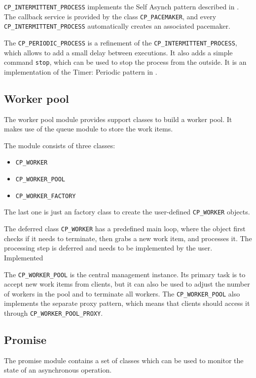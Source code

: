 \documentclass[a4paper,10pt]{report}
\begin{document}
\lstinline!CP_INTERMITTENT_PROCESS! implements the Self Asynch pattern described in .
The callback service is provided by the class \lstinline!CP_PACEMAKER!, and every \lstinline!CP_INTERMITTENT_PROCESS! automatically creates an associated pacemaker.

The \lstinline!CP_PERIODIC_PROCESS! is a refinement of the \lstinline!CP_INTERMITTENT_PROCESS!, which allows to add a small delay between executions.
It also adds a simple command \lstinline!stop!, which can be used to stop the process from the outside.
It is an implementation of the Timer: Periodic pattern in .

\subsection{Worker pool}

The worker pool module provides support classes to build a worker pool.
It makes use of the queue module to store the work items.

The module consists of three classes:

\begin{itemize}
 \item \lstinline!CP_WORKER!
 \item \lstinline!CP_WORKER_POOL!
 \item \lstinline!CP_WORKER_FACTORY!
\end{itemize}

The last one is just an factory class to create the user-defined \lstinline!CP_WORKER! objects.

The deferred class \lstinline!CP_WORKER! has a predefined main loop, where the object first checks if it needs to terminate, then grabs a new work item, and processes it.
The processing step is deferred and needs to be implemented by the user.
Implemented

The \lstinline!CP_WORKER_POOL! is the central management instance.
Its primary task is to accept new work items from clients, but it can also be used to adjust the number of workers in the pool and to terminate all workers.
The \lstinline!CP_WORKER_POOL! also implements the separate proxy pattern, which means that clients should access it through \lstinline!CP_WORKER_POOL_PROXY!.

\subsection{Promise}

The promise module contains a set of classes which can be used to monitor the state of an asynchronous operation.
\end{document}
